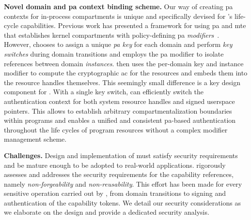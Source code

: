 \textbf{Novel domain and \gls{pa} context binding scheme.}
Our way of creating \gls{pa} contexts for in-process compartments is unique and specifically devised for \thename's life-cycle capabilities.
Previous work has presented a framework for using \gls{pa} and \gls{mte} that establishes kernel compartments with policy-defining \gls{pa} \emph{modifiers}~\cite{hakc}.
However, \thename chooses to assign a unique \emph{\gls{pa} key} for each domain and perform \emph{key switches} during domain transitions and employs the \gls{pa} modifier to isolate references between domain \emph{instances}.
\thename then uses the per-domain key and instance modifier to compute the cryptographic \gls{ac} for the resources and embeds them into the resource handles themselves.
This seemingly small difference is a key design component for \thename.
With a single key switch, \thename can efficiently switch the authentication context for both system resource handles and signed userspace pointers.
This allows \thename to establish arbitrary compartmentalization boundaries within programs and enables a unified and consistent \gls{pa}-based authentication throughout the life cycles of program resources without a complex modifier management scheme.





\textbf{Challenges.} Design and implementation of \thename must satisfy security requirements and be mature enough to be adopted to real-world applications.
\thename rigorously assesses and addresses the security requirements for the capability references, namely \emph{non-forgeability} and \emph{non-reusability}.
This effort has been made for every sensitive operation carried out by \thename, from domain transitions to signing and authentication of the capability tokens.
We detail our security considerations as we elaborate on the design and provide a dedicated security analysis.


